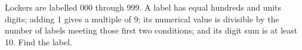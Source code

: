 Lockers are labelled 000 through 999. A label has equal hundreds and units digits; adding 1 gives a multiple of 9; its numerical value is divisible by the number of labels meeting those first two conditions; and its digit sum is at least 10. Find the label.
